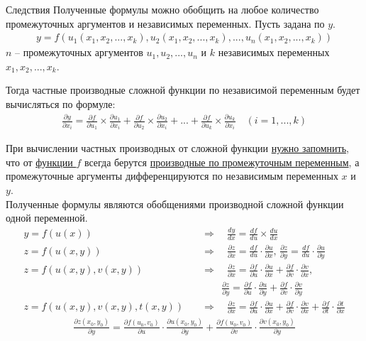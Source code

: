 \begin{tbox}{Следствия}
	Полученные формулы можно обобщить на любое количество промежуточных аргументов и независимых переменных. Пусть задана по $y$.
	\begin{align}
		y = f(u_1(x_1, x_2, ..., x_k), u_2(x_1, x_2, ..., x_k), ..., u_n(x_1, x_2, ..., x_k))
	\end{align}
	$n$ -- промежуточных аргументов $u_1, u_2, ..., u_n$ и $k$ независимых переменных $x_1, x_2, ..., x_k$.

	Тогда частные производные сложной функции по независимой переменным будет вычисляться по формуле:
	\begin{align}
		\boxed{\frac{\partial y}{\partial x_i} = \frac{\partial f}{\partial u_1} \times \frac{\partial u_1}{\partial x_i} + \frac{\partial f}{\partial u_2} \times \frac{\partial u_2}{\partial x_i} + ... + \frac{\partial f}{\partial u_k} \times \frac{\partial u_k}{\partial x_i} \quad (i = 1, ..., k)}
	\end{align}

	При вычислении частных производных от сложной функции \uline{нужно запомнить}, что от \uline{функции $f$} всегда берутся \uline{производные по промежуточным  переменным}, а промежуточные аргументы дифференцируются по независимым переменных $x$ и $y$.\\

	Полученные формулы являются обобщениями производной сложной функции одной переменной.
	\begin{align*}
		y = f(u(x)) \quad &\Rightarrow \quad \frac{d y}{d x} = \frac{d f}{d u} \times \frac{d u}{d x}\\
		z = f(u(x,y)) \quad &\Rightarrow \quad \frac{\partial z}{\partial x} = \frac{d  f}{d  u} \cdot \frac{\partial u}{\partial x}, \, \frac{\partial z}{\partial y} = \frac{d  f}{d  u} \cdot \frac{\partial u}{\partial y}\\
		z = f(u(x,y), v(x,y)) \quad &\Rightarrow \quad \frac{\partial z}{\partial x} = \frac{\partial f}{\partial u} \cdot \frac{\partial u}{\partial x} + \frac{\partial f}{\partial v} \cdot \frac{\partial v}{\partial x}, \\
		& \qquad \frac{\partial z}{\partial y} = \frac{\partial f}{\partial u} \cdot \frac{\partial u}{\partial y} + \frac{\partial f}{\partial v} \cdot \frac{\partial v}{\partial y} \\
		z = f(u(x,y), v(x,y), t(x,y)) \quad &\Rightarrow \quad \frac{\partial z}{\partial x} = \frac{\partial f}{\partial u} \cdot \frac{\partial u}{\partial x} + \frac{\partial f}{\partial v} \cdot \frac{\partial v}{\partial x} + \frac{\partial f}{\partial t} \cdot \frac{\partial t}{\partial x}
	\end{align*}
	\begin{align}
		\frac{\partial z(x_0, y_0)}{\partial y} = \frac{\partial f(u_0, v_0)}{\partial u} \cdot \frac{\partial u(x_0, y_0)}{\partial y} + \frac{\partial f(u_0, v_0)}{\partial v} \cdot \frac{\partial v(x_0, y_0)}{\partial y}
	\end{align}
\end{tbox}